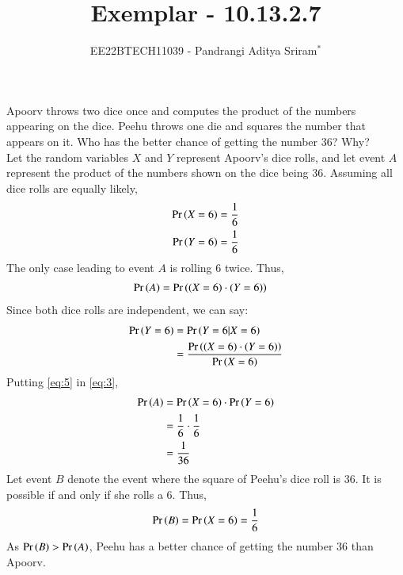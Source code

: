 \documentclass[journal,12pt,twocolumn]{IEEEtran}
\theoremstyle{remark}
\begin{document}

\vspace{3cm}

\title{Exemplar - 10.13.2.7}
\author{EE22BTECH11039 - Pandrangi Aditya Sriram$^{*}$%
}
\maketitle
\newpage
\bigskip

\renewcommand{\thefigure}{\theenumi}
\renewcommand{\thetable}{\theenumi}

Apoorv throws two dice once and computes the product of the numbers appearing
on the dice. Peehu throws one die and squares the number that appears on it. Who
has the better chance of getting the number 36? Why?\\\solution
Let the random variables $X$ and $Y$ represent Apoorv's dice rolls, and let event $A$ represent the product of the numbers shown on the dice being 36. Assuming all dice rolls are equally likely,
\begin{align}
\Pr\left(X=6\right) &= \frac{1}{6}\\
\Pr\left(Y=6\right) &= \frac{1}{6}
\end{align}
The only case leading to event $A$ is rolling 6 twice. Thus, 
\begin{align}
\Pr\left(A\right) &= \Pr\left((X=6)\cdot(Y=6)\right) \label{eq:3}
\end{align}
Since both dice rolls are independent, we can say:
\begin{align}
\Pr\left(Y=6\right) &= \Pr\left(Y=6 | X=6\right)\\
&= \frac{\Pr\left((X=6)\cdot(Y=6)\right)}{\Pr\left(X=6\right)} \label{eq:5}
\end{align}
Putting \eqref{eq:5} in \eqref{eq:3},
\begin{align}
\Pr\left(A\right) &= \Pr\left(X=6\right)\cdot\Pr\left(Y=6\right)\\
&= \frac{1}{6}\cdot\frac{1}{6}\\
&= \frac{1}{36}
\end{align}
Let event $B$ denote the event where the square of Peehu's dice roll is 36. It is possible if and only if she rolls a 6. Thus,
\begin{align}
\Pr\left(B\right) = \Pr\left(X=6\right) = \frac{1}{6} 
\end{align}
As $\Pr\left(B\right) > \Pr\left(A\right)$, Peehu has a better chance of getting the number 36 than Apoorv.
\end{document}
